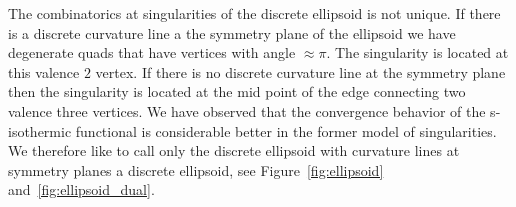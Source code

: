 \documentclass[Thesis.tex]{subfiles}
\begin{document}
The combinatorics at singularities of the discrete ellipsoid is not unique. If there is a discrete 
curvature line a the symmetry plane of the ellipsoid we have degenerate quads that have 
vertices with angle $\approx\pi$. The singularity is located at this valence $2$ vertex. 
If there is no discrete curvature line at the symmetry plane then the singularity is located at the 
mid point of the edge connecting two valence three vertices. We have observed that 
the convergence behavior of the s-isothermic functional is considerable better in the former 
model of singularities. We therefore like to call only the discrete ellipsoid with curvature 
lines at symmetry planes a discrete ellipsoid, see Figure~\ref{fig:ellipsoid} and~\ref{fig:ellipsoid_dual}.

\subfilebibliography
\end{document}
